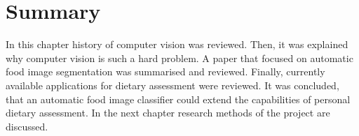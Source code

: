 \section{Summary}
In this chapter history of computer vision was reviewed. Then, it was explained why computer vision is such a hard problem. A paper that focused on automatic food image segmentation was summarised and reviewed. Finally, currently available applications for dietary assessment were reviewed. It was concluded, that an automatic food image classifier could extend the capabilities of personal dietary assessment. In the next chapter research methods of the project are discussed.